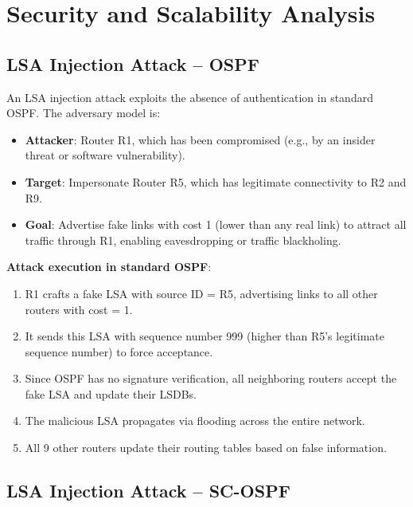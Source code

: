 \documentclass[12pt,a4paper]{article}
\begin{document}
\section{Security and Scalability Analysis}

\subsection{LSA Injection Attack -- OSPF}

An LSA injection attack exploits the absence of authentication in standard OSPF.
The adversary model is:

\begin{itemize}
  \item \textbf{Attacker}: Router R1, which has been compromised (e.g., by an
  insider threat or software vulnerability).
  \item \textbf{Target}: Impersonate Router R5, which has legitimate connectivity
  to R2 and R9.
  \item \textbf{Goal}: Advertise fake links with cost 1 (lower than any real link)
  to attract all traffic through R1, enabling eavesdropping or traffic blackholing.
\end{itemize}

\textbf{Attack execution in standard OSPF}:
\begin{enumerate}
  \item R1 crafts a fake LSA with source ID = R5, advertising links to all other
  routers with cost = 1.
  \item It sends this LSA with sequence number 999 (higher than R5's legitimate
  sequence number) to force acceptance.
  \item Since OSPF has no signature verification, all neighboring routers accept
  the fake LSA and update their LSDBs.
  \item The malicious LSA propagates via flooding across the entire network.
  \item All 9 other routers update their routing tables based on false information.
\end{enumerate}

\subsection{LSA Injection Attack -- SC-OSPF}
\end{document}
